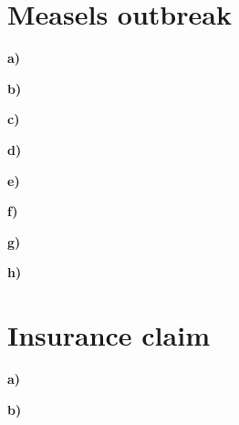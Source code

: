 \documentclass[11pt, a4paper, english]{NTNUoving}
\begin{document}
\section*{Measels outbreak}

%
%
%
%
%
%
%
%

\textbf{a)}

\newline
\textbf{b)}

\newline
\textbf{c)}

\newline
\textbf{d)}

\newline
\textbf{e)}

\newline
\textbf{f)}

\newline
\textbf{g)}

\newline
\textbf{h)}




\section*{Insurance claim}
\textbf{a)}

\newline
\bigskip
\textbf{b)}

\end{document}
